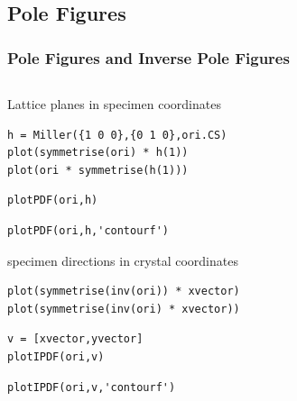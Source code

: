\documentclass[compress]{beamer}
\begin{document}
\subsection*{Pole Figures}

\begin{frame}[fragile]
  \frametitle{Pole Figures and Inverse Pole Figures}

  \begin{columns}
    \begin{column}{8.5cm}
      Lattice planes in specimen coordinates
      \begin{lstlisting}[style=input]
h = Miller({1 0 0},{0 1 0},ori.CS)
plot(symmetrise(ori) * h(1))
plot(ori * symmetrise(h(1)))
      \end{lstlisting}

      \pause
      \medskip

      \begin{lstlisting}[style=input]
plotPDF(ori,h)
      \end{lstlisting}
      \pause
      \vspace{-0.3cm}
      \begin{lstlisting}[style=input]
plotPDF(ori,h,'contourf')
      \end{lstlisting}

      \pause
      \medskip

      specimen directions in crystal coordinates
      \begin{lstlisting}[style=input]
plot(symmetrise(inv(ori)) * xvector)
plot(symmetrise(inv(ori) * xvector))
      \end{lstlisting}
      \pause
      \vspace{-0.3cm}
      \begin{lstlisting}[style=input]
v = [xvector,yvector]
plotIPDF(ori,v)
      \end{lstlisting}
      \pause
      \vspace{-0.3cm}
      \begin{lstlisting}[style=input]
plotIPDF(ori,v,'contourf')
      \end{lstlisting}


    \end{column}
    \begin{column}{3.5cm}


\end{column}
\end{columns}
\end{frame}
\end{document}
